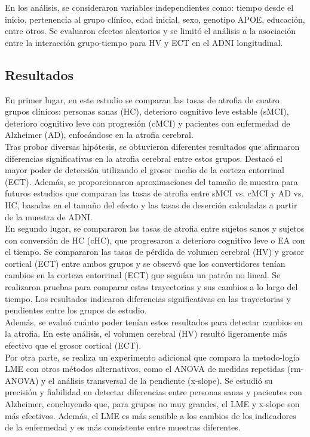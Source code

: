 	En los análisis, se consideraron variables independientes como: tiempo desde el inicio, pertenencia al grupo clínico, edad inicial, sexo, genotipo APOE, educación, entre otros. Se evaluaron efectos aleatorios y se limitó el análisis a la asociación entre la interacción grupo-tiempo para HV y ECT en el ADNI longitudinal.
	
	
	\subsection{Resultados}
	En primer lugar, en este estudio se comparan las tasas de atrofia de cuatro grupos clínicos: personas sanas (HC), deterioro cognitivo leve estable (sMCI), deterioro cognitivo leve con progresión (cMCI) y pacientes con enfermedad de Alzheimer (AD), enfocándose en la atrofia cerebral.\\
	
	Tras probar diversas hipótesis, se obtuvieron diferentes resultados que afirmaron diferencias significativas en la atrofia cerebral entre estos grupos. Destacó el mayor poder de detección utilizando el grosor medio de la corteza entorrinal (ECT). Además, se proporcionaron aproximaciones del tamaño de muestra para futuros estudios que comparan las tasas de atrofia entre sMCI vs. cMCI y AD vs. HC, basadas en el tamaño del efecto y las tasas de deserción calculadas a partir de la muestra de ADNI.\\
	
	En segundo lugar, se compararon las tasas de atrofia entre sujetos sanos y sujetos con conversión de HC (cHC), que progresaron a deterioro cognitivo leve o EA con el tiempo. Se compararon las tasas de pérdida de volumen cerebral (HV) y grosor cortical (ECT) entre ambos grupos y se observó que los convertidores tenían cambios en la corteza entorrinal (ECT) que seguían un patrón no lineal. Se realizaron pruebas para comparar estas trayectorias y sus cambios a lo largo del tiempo. Los resultados indicaron diferencias significativas en las trayectorias y pendientes entre los grupos de estudio.\\
	
	Además, se evaluó cuánto poder tenían estos resultados para detectar cambios en la atrofia. En este análisis, el volumen cerebral (HV) resultó ligeramente más efectivo que el grosor cortical (ECT).\\
	
	Por otra parte, se realiza un experimento adicional que compara la metodo-logía LME con otros métodos alternativos, como el ANOVA de medidas repetidas (rm-ANOVA) y el análisis transversal de la pendiente (x-slope). Se estudió su precisión y fiabilidad en detectar diferencias entre personas sanas y pacientes con Alzheimer, concluyendo que, para grupos no muy grandes, el LME y x-slope son más efectivos. Además, el LME es más sensible a los cambios de los indicadores de la enfermedad y es más consistente entre muestras diferentes.\\
	
